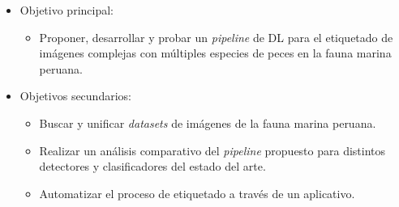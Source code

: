 \begin{itemize}
    \item { Objetivo principal: 
        \begin{itemize}
            \item Proponer, desarrollar y probar un 
                \textit{pipeline} de DL para el etiquetado de imágenes complejas 
                con múltiples especies de peces en la fauna marina peruana.
        \end{itemize}
     }
     \item { Objetivos secundarios:
        \begin{itemize}
            \item Buscar y unificar \textit{datasets} de imágenes de la fauna marina 
            peruana.
            \item Realizar un análisis comparativo del \textit{pipeline} propuesto para 
                distintos detectores y clasificadores del estado del arte. 
            \item Automatizar el proceso de etiquetado a través de un aplicativo.
        \end{itemize}
        }
\end{itemize}